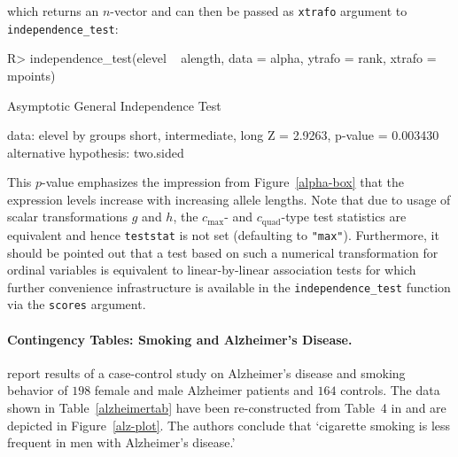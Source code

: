 \documentclass{article}
\newcommand{\Rcmd}[1]{\texttt{#1}}
\newenvironment{Schunk}{}{}
\begin{document}
which returns an $n$-vector and 
can then be passed as \Rcmd{xtrafo} argument to \Rcmd{independence\_test}:
\begin{Schunk}
\begin{Sinput}
R> independence_test(elevel ~ alength, data = alpha, 
       ytrafo = rank, xtrafo = mpoints)
\end{Sinput}
\begin{Soutput}
	Asymptotic General Independence Test

data:  elevel by groups short, intermediate, long 
Z = 2.9263, p-value = 0.003430
alternative hypothesis: two.sided 
\end{Soutput}
\end{Schunk}
This $p$-value emphasizes the impression from Figure~\ref{alpha-box}
that the expression levels increase with increasing allele lengths.
Note that due to usage of scalar transformations $g$ and 
$h$, the $c_\text{max}$- and $c_\text{quad}$-type test statistics are
equivalent and hence \Rcmd{teststat} is not set (defaulting to \Rcmd{"max"}).
Furthermore, it should be pointed out that a test based on such a numerical
transformation for ordinal variables is equivalent to 
linear-by-linear association tests \citep{Agresti2002} for which further
convenience infrastructure is available in the \Rcmd{independence\_test}
function via the \Rcmd{scores} argument.

\paragraph{Contingency Tables: Smoking and Alzheimer's Disease.}


\cite{SalibHillier1997} 
report results of a case-control study on Alzheimer's disease
and smoking behavior of $198$ female
and male Alzheimer patients and 
$164$ controls.
The data shown in Table~\ref{alzheimertab} have been 
re-constructed from Table~4 in \cite{SalibHillier1997} and are depicted in
Figure~\ref{alz-plot}. 
The authors conclude that `cigarette smoking is less frequent in 
men with Alzheimer's disease.' 
\end{document}
